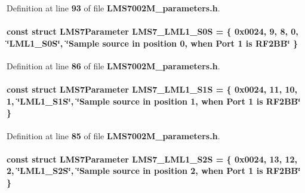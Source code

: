 Definition at line {\bf 93} of file {\bf L\+M\+S7002\+M\+\_\+parameters.\+h}.

\paragraph[{L\+M\+S7\+\_\+\+L\+M\+L1\+\_\+\+S0S}]{\setlength{\rightskip}{0pt plus 5cm}const struct {\bf L\+M\+S7\+Parameter} L\+M\+S7\+\_\+\+L\+M\+L1\+\_\+\+S0S = \{ 0x0024, 9, 8, 0, \char`\"{}\+L\+M\+L1\+\_\+\+S0\+S\char`\"{}, \char`\"{}\+Sample source in position 0, when Port 1 is R\+F2\+B\+B\char`\"{} \}\hspace{0.3cm}{\ttfamily [static]}}\label{LMS7002M__parameters_8h_ab80512bc47d800dfc023b5b47f6c1238}


Definition at line {\bf 86} of file {\bf L\+M\+S7002\+M\+\_\+parameters.\+h}.

\paragraph[{L\+M\+S7\+\_\+\+L\+M\+L1\+\_\+\+S1S}]{\setlength{\rightskip}{0pt plus 5cm}const struct {\bf L\+M\+S7\+Parameter} L\+M\+S7\+\_\+\+L\+M\+L1\+\_\+\+S1S = \{ 0x0024, 11, 10, 1, \char`\"{}\+L\+M\+L1\+\_\+\+S1\+S\char`\"{}, \char`\"{}\+Sample source in position 1, when Port 1 is R\+F2\+B\+B\char`\"{} \}\hspace{0.3cm}{\ttfamily [static]}}\label{LMS7002M__parameters_8h_ac2cdd31d67815c643f1b0064f66dc456}


Definition at line {\bf 85} of file {\bf L\+M\+S7002\+M\+\_\+parameters.\+h}.

\paragraph[{L\+M\+S7\+\_\+\+L\+M\+L1\+\_\+\+S2S}]{\setlength{\rightskip}{0pt plus 5cm}const struct {\bf L\+M\+S7\+Parameter} L\+M\+S7\+\_\+\+L\+M\+L1\+\_\+\+S2S = \{ 0x0024, 13, 12, 2, \char`\"{}\+L\+M\+L1\+\_\+\+S2\+S\char`\"{}, \char`\"{}\+Sample source in position 2, when Port 1 is R\+F2\+B\+B\char`\"{} \}\hspace{0.3cm}{\ttfamily [static]}}\label{LMS7002M__parameters_8h_aceccb44e7bf5b508532e9ac12fa32e56}


